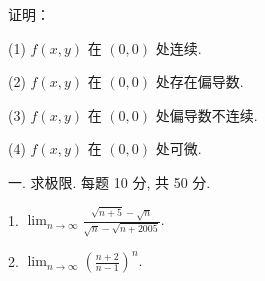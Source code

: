 \documentclass{examcollection}
\begin{document}
{\begin{minipage}{\textwidth}
证明：\par
(1) $f(x,y)$ 在 $(0,0)$ 处连续.\par
(2) $f(x,y)$ 在 $(0,0)$ 处存在偏导数.\par
(3) $f(x,y)$ 在 $(0,0)$ 处偏导数不连续.\par
(4) $f(x,y)$ 在 $(0,0)$ 处可微.\par
{}\smallskip
一. 求极限. 每题 10 分, 共 50 分.\par
1. $\lim_{n\to \infty}\frac{\sqrt{n + 5} - \sqrt{n}}{\sqrt{n} - \sqrt{n + 2005}}.$\par
2. $\lim_{n\to \infty}\left(\frac{n + 2}{n - 1}\right)^n.$\par
\end{minipage}}
\ifdim\dimexpr\ht\proofbox+\dp\proofbox\relax>\textheight
\noindent\resizebox{!}{\textheight}{\usebox{\proofbox}}\else\noindent\usebox{\proofbox}\fi\clearpage
\end{document}
